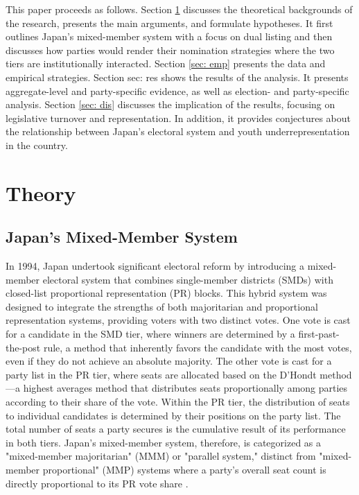 \documentclass[a4paper, 11pt]{article}
\begin{document}
This paper proceeds as follows. Section \ref{sec: the} discusses the theoretical backgrounds of the research, presents the main arguments, and formulate hypotheses. It first outlines Japan's mixed-member system with a focus on dual listing and then discusses how parties would render their nomination strategies where the two tiers are institutionally interacted. Section \ref{sec: emp} presents the data and empirical strategies. Section {sec: res} shows the results of the analysis. It presents aggregate-level and party-specific evidence, as well as election- and party-specific analysis. Section \ref{sec: dis} discusses the implication of the results, focusing on legislative turnover and representation. In addition, it provides conjectures about the relationship between Japan's electoral system and youth underrepresentation in the country. 

\section{Theory} \label{sec: the}

\subsection{Japan's Mixed-Member System}

In 1994, Japan undertook significant electoral reform by introducing a mixed-member electoral system that combines single-member districts (SMDs) with closed-list proportional representation (PR) blocks. This hybrid system was designed to integrate the strengths of both majoritarian and proportional representation systems, providing voters with two distinct votes. One vote is cast for a candidate in the SMD tier, where winners are determined by a first-past-the-post rule, a method that inherently favors the candidate with the most votes, even if they do not achieve an absolute majority. The other vote is cast for a party list in the PR tier, where seats are allocated based on the D'Hondt method—a highest averages method that distributes seats proportionally among parties according to their share of the vote. Within the PR tier, the distribution of seats to individual candidates is determined by their positions on the party list. The total number of seats a party secures is the cumulative result of its performance in both tiers. Japan's mixed-member system, therefore, is categorized as a "mixed-member majoritarian" (MMM) or "parallel system," distinct from "mixed-member proportional" (MMP) systems where a party's overall seat count is directly proportional to its PR vote share \citep{shugart_mixed-member_2003}.
\end{document}
